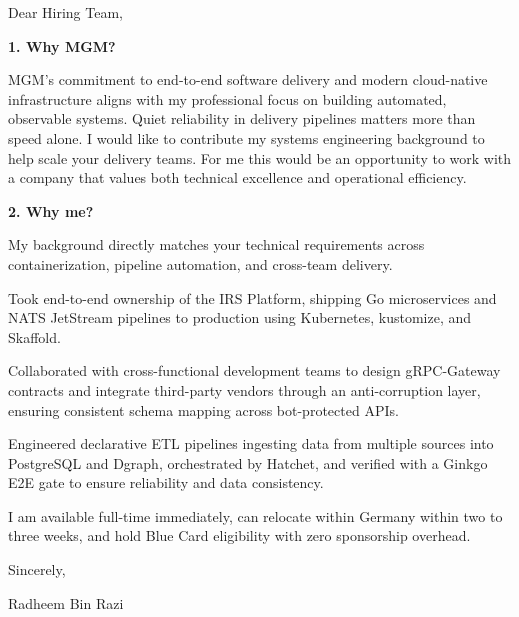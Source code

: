 \documentclass[11pt,a4paper]{coverletter}
\begin{document}

\opening{Dear Hiring Team,}

\vspace{8pt}\noindent\textbf{1. Why MGM?}\par\vspace{3pt}

MGM’s commitment to end-to-end software delivery and modern cloud-native infrastructure aligns with my professional focus on building automated, observable systems. Quiet reliability in delivery pipelines matters more than speed alone. I would like to contribute my systems engineering background to help scale your delivery teams. For me this would be an opportunity to work with a company that values both technical excellence and operational efficiency.

\vspace{8pt}\noindent\textbf{2. Why me?}\par\vspace{3pt}

My background directly matches your technical requirements across containerization, pipeline automation, and cross-team delivery.

\bullets

  \item Took end-to-end ownership of the IRS Platform, shipping Go microservices and NATS JetStream pipelines to production using Kubernetes, kustomize, and Skaffold.

  \item Collaborated with cross-functional development teams to design gRPC-Gateway contracts and integrate third-party vendors through an anti-corruption layer, ensuring consistent schema mapping across bot-protected APIs.

  \item Engineered declarative ETL pipelines ingesting data from multiple sources into PostgreSQL and Dgraph, orchestrated by Hatchet, and verified with a Ginkgo E2E gate to ensure reliability and data consistency.

\bulletsend

I am available full-time immediately, can relocate within Germany within two to three weeks, and hold Blue Card eligibility with zero sponsorship overhead.

\closing{Sincerely,}{Radheem Bin Razi}

\clearpage
{}

\end{document}
